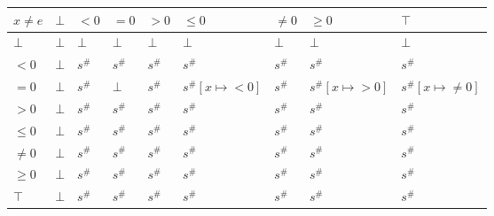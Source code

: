 \documentclass{article}
\begin{document}
    \begin{table}
        \begin{tabular}{|l|l|l|l|l|l|l|l|l|}
        \hline
        $x \ne e$ & $\bot$ & $<0$   & $=0$   & $>0$   & $\le 0$              & $\ne 0$ & $\ge 0$              & $\top$                  \\ \hline
        $\bot$    & $\bot$ & $\bot$ & $\bot$ & $\bot$ & $\bot$               & $\bot$  & $\bot$               & $\bot$                  \\ \hline
        $<0$      & $\bot$ & $s^\#$ & $s^\#$ & $s^\#$ & $s^\#$               & $s^\#$  & $s^\#$               & $s^\#$                  \\ \hline
        $=0$      & $\bot$ & $s^\#$ & $\bot$ & $s^\#$ & $s^\#[x \mapsto <0]$ & $s^\#$  & $s^\#[x \mapsto >0]$ & $s^\#[x \mapsto \ne 0]$ \\ \hline
        $>0$      & $\bot$ & $s^\#$ & $s^\#$ & $s^\#$ & $s^\#$               & $s^\#$  & $s^\#$               & $s^\#$                  \\ \hline
        $\le 0$   & $\bot$ & $s^\#$ & $s^\#$ & $s^\#$ & $s^\#$               & $s^\#$  & $s^\#$               & $s^\#$                  \\ \hline
        $\ne 0$   & $\bot$ & $s^\#$ & $s^\#$ & $s^\#$ & $s^\#$               & $s^\#$  & $s^\#$               & $s^\#$                  \\ \hline
        $\ge 0$   & $\bot$ & $s^\#$ & $s^\#$ & $s^\#$ & $s^\#$               & $s^\#$  & $s^\#$               & $s^\#$                  \\ \hline
        $\top$    & $\bot$ & $s^\#$ & $s^\#$ & $s^\#$ & $s^\#$               & $s^\#$  & $s^\#$               & $s^\#$                  \\ \hline
        \end{tabular}
        \end{table}
\end{document}
